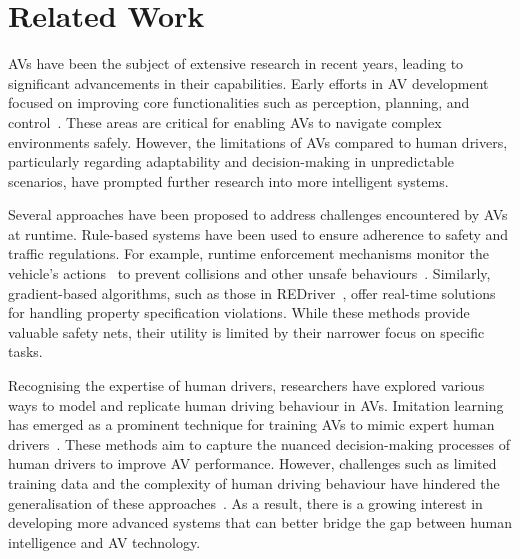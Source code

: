 \section{Related Work} \label{sec:related}
AVs have been the subject of extensive research in recent years, leading to significant advancements in their capabilities. Early efforts in AV development focused on improving core functionalities such as perception, planning, and control~\cite{levinson2011towards, yurtsever2020survey}. These areas are critical for enabling AVs to navigate complex environments safely. However, the limitations of AVs compared to human drivers, particularly regarding adaptability and decision-making in unpredictable scenarios, have prompted further research into more intelligent systems.


Several approaches have been proposed to address challenges encountered by AVs at runtime. Rule-based systems have been used to ensure adherence to safety and traffic regulations. For example, runtime enforcement mechanisms monitor the vehicle's actions~\cite{Mauritz-et_al16a, d2005lola, Watanabe-et_al18a} to prevent collisions and other unsafe behaviours~\cite{Grieser-et_al20a, hong2020avguardian, Cheng-et_al21a, Shankar-et_al20a}. Similarly, gradient-based algorithms, such as those in REDriver~\cite{sun2024redriver}, offer real-time solutions for handling property specification violations. While these methods provide valuable safety nets, their utility is limited by their narrower focus on specific tasks.

Recognising the expertise of human drivers, researchers have explored various ways to model and replicate human driving behaviour in AVs. Imitation learning has emerged as a prominent technique for training AVs to mimic expert human drivers~\cite{sama2020extracting, wei2010learning, xu2020learning}. These methods aim to capture the nuanced decision-making processes of human drivers to improve AV performance. However, challenges such as limited training data and the complexity of human driving behaviour have hindered the generalisation of these approaches~\cite{le2022survey}. As a result, there is a growing interest in developing more advanced systems that can better bridge the gap between human intelligence and AV technology.

